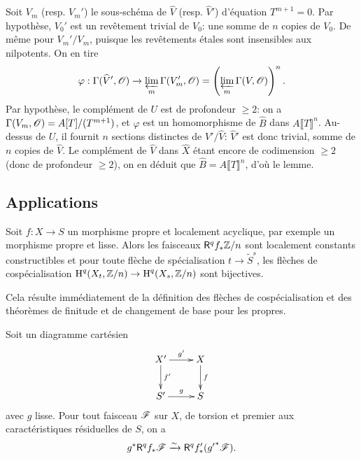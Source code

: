 \documentclass[oneside]{book}
\begin{document}
Soit $V_m$ (resp. $V_m'$) le sous-schéma de $\widehat V$ (resp. $\widehat V'$) 
d'équation $T^{m+1} = 0$. Par hypothèse, $V_0'$ est un revêtement trivial 
de $V_0$: une somme de $n$ copies de $V_0$. De même pour $V_m'/V_m$, puisque 
les revêtements étales sont insensibles aux nilpotents. On en tire 
\[
  \varphi : \Gamma(\widehat V',\mathscr{O}) \to \varprojlim_m \Gamma(V_m',\mathscr{O}) = \left(\varprojlim_m \Gamma(V,\mathscr{O})\right)^n \text{.}
\]
Par hypothèse, le complément de $U$ est de profondeur $\geqslant 2$: on a 
$\Gamma(V_m,\mathscr{O})=A[T]/(T^{m+1})$, et $\varphi$ est un homomorphisme de 
$\widehat B$ dans $A\llbracket T\rrbracket^n$. Au-dessus de $U$, il fournit $n$ 
sections distinctes de $\widehat V'/\widehat V$: $\widehat V'$ est donc trivial, 
somme de $n$ copies de $\widehat V$. Le complément de $\widehat V$ dans 
$\widehat X$ étant encore de codimension $\geqslant 2$ (donc de profondeur 
$\geqslant 2$), on en déduit que $\widehat B=A\llbracket T\rrbracket^n$, 
d'où le lemme. 










\subsection{Applications}\label{I:5-3}





\begin{theorem}\label{I:5-3-1}
Soit $f:X\to S$ un morphisme propre et localement acyclique, par exemple un 
morphisme propre et lisse. Alors les faisceaux $\mathsf{R}^q f_*\mathbb{Z}/n$ sont localement 
constants constructibles et pour toute flèche de spécialisation 
$t\to\widetilde S^s$, les flèches de cospécialisation 
$\operatorname{H}^q(X_t,\mathbb{Z}/n)\to\operatorname{H}^q(X_s,\mathbb{Z}/n)$ sont bijectives.
\end{theorem}

Cela résulte immédiatement de la définition des flèches de 
cospécialisation et des théorèmes de finitude et de changement de base pour 
les propres. 





\begin{theorem}\label{I:5-3-2}
Soit un diagramme cartésien 
\[\xymatrix{
  X' \ar[r]^-{g'} \ar[d]^-{f'} 
    & X \ar[d]^-f \\
  S' \ar[r]^-{g} 
    & S
}\]
avec $g$ lisse. Pour tout faisceau $\mathscr{F}$ sur $X$, de torsion et premier aux 
caractéristiques résiduelles de $S$, on a 
\[
  g^* \mathsf{R}^q f_* \mathscr{F} \xrightarrow\sim \mathsf{R}^q f_*'({g'}^* \mathscr{F}) \text{.}
\]
\end{theorem}
\end{document}
